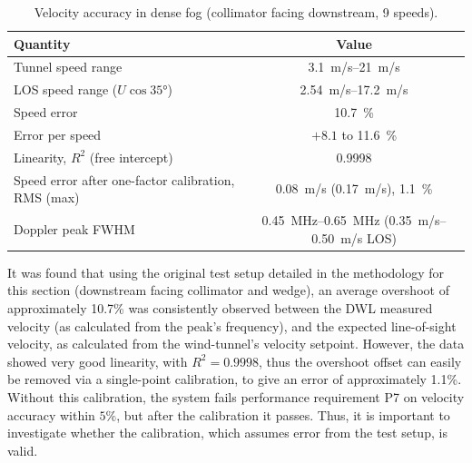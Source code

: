 \begin{table}[H]
	\centering
	\small
	\begin{tabular}{|l|c|}
		\hline
		\textbf{Quantity} & \textbf{Value} \\ \hline
		Tunnel speed range & \SIrange[range-phrase=--, range-units=single]{3.1}{21}{m/s} \\ \hline
		LOS speed range ($U\cos\ang{35}$) & \SIrange[range-phrase=--, range-units=single]{2.54}{17.2}{m/s} \\ \hline
		Speed error & \SI[retain-explicit-plus]{+10.7}{\percent} \\ \hline
		Error per speed & $+8.1$ to \SI[retain-explicit-plus]{+11.6}{\percent} \\ \hline
		Linearity, $R^2$ (free intercept) & 0.9998 \\ \hline
		Speed error after one-factor calibration, RMS (max) & \SI{0.08}{m/s} (\SI{0.17}{m/s}), \SI{1.1}{\percent} \\ \hline
		Doppler peak FWHM & \SIrange[range-phrase=--, range-units=single]{0.45}{0.65}{MHz} (\SIrange[range-phrase=--, range-units=single]{0.35}{0.50}{m/s} LOS) \\ \hline
	\end{tabular}
	\caption{Velocity accuracy in dense fog (collimator facing downstream, 9 speeds).}
	\label{tab:D_velocity_summary}
\end{table}

It was found that using the original test setup detailed in the methodology for this section (downstream facing collimator and wedge), an average overshoot of approximately 10.7\% was consistently observed between the DWL measured velocity (as calculated from the peak's frequency), and the expected line-of-sight velocity, as calculated from the wind-tunnel's velocity setpoint. However, the data showed very good linearity, with $R^2=0.9998$, thus the overshoot offset can easily be removed via a single-point calibration, to give an error of approximately 1.1\%. Without this calibration, the system fails performance requirement P7 on velocity accuracy within $5\%$, but after the calibration it passes. Thus, it is important to investigate whether the calibration, which assumes error from the test setup, is valid.


